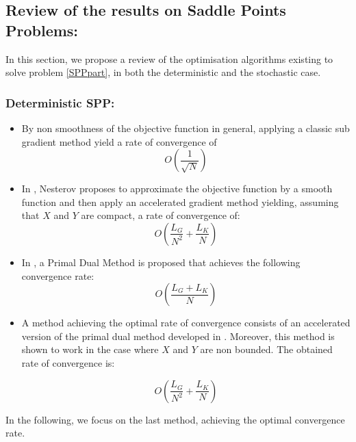 \documentclass[10pt]{article}
\begin{document}
\subsection{ Review of the results on Saddle Points Problems: }


In this section, we propose a review of the optimisation algorithms existing to solve problem \ref{SPPpart}, in both the deterministic and the stochastic case.

\subsubsection{Deterministic SPP: }



\begin{itemize}

\item By non smoothness of the objective function in general, applying a classic sub gradient method \cite{YudinNemirovski} yield a rate of convergence of
$$
O(\dfrac{1}{\sqrt{N}})
$$

\item In \cite{Nesterov}, Nesterov proposes to approximate the objective function by a smooth function and then apply an accelerated gradient method yielding, assuming that $X$ and $Y$ are compact, a rate of convergence of:
$$
O(\dfrac{L_{G}}{N^2} + \dfrac{L_{K}}{N})
$$

\item In \cite{ChambollePock}, a Primal Dual Method is proposed that achieves the following convergence rate:
$$
O(\dfrac{L_{G} + L_{K}}{N})
$$
\item A method achieving the optimal rate of convergence consists of an accelerated version of the primal dual method developed in \cite{ChenLanOuyang}.
Moreover, this method is shown to work in the case where $X$ and $Y$ are non bounded.
The obtained rate of convergence is:

$$
O(\dfrac{L_{G}}{N^2} + \dfrac{L_{K}}{N})
$$


\end{itemize}

In the following, we focus on the last method, achieving the optimal convergence rate.

%
\end{document}
